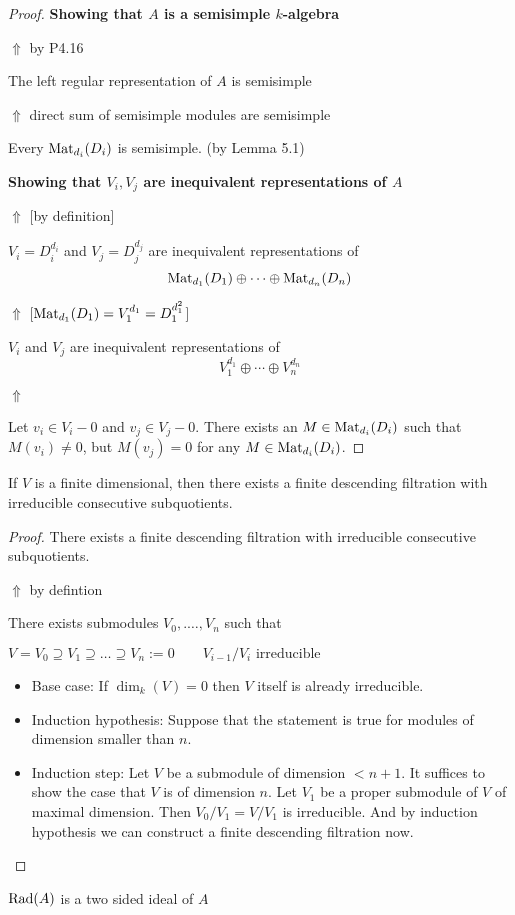 \begin{proof}
\textbf{Showing that \(A\) is a semisimple \(k\)-algebra}

\(\Uparrow \) by P4.16

The left regular representation of \(A\) is semisimple

\(\Uparrow \) direct sum of semisimple modules are semisimple

Every \(\operatorname{Mat}_{d_{i}}(D_{i})\) is semisimple. (by Lemma 5.1)

\textbf{Showing that $V_{i},V_{j}$ are inequivalent representations of \(A\)}

\(\Uparrow \) [by definition]

\(V_{i}=D_{i}^{d_{i}}\) and \(V_{j}=D_{j}^{d_{j}}\) are inequivalent representations of
\[
\operatorname{Mat}_{d_{1}}(D_{1})\oplus \cdots \oplus \operatorname{Mat}_{d_{n}}(D_{n})
\]

\(\Uparrow \) [\(\operatorname{Mat}_{d_{1}}(D_{1})=V_{1}^{d_{1}}=D_{1}^{d_{1}^2}\)]

\(V_{i}\) and \(V_{j}\) are inequivalent representations of
\[
V_{1}^{d_{1}}\oplus \cdots \oplus V_{n}^{d_{n}}
\]

\(\Uparrow \)

Let \(v_{i}\in V_{i}-0\) and \(v_{j}\in V_{j}-0\). There exists an \(M\in \operatorname{Mat}_{d_{i}}(D_{i})\) such that \(M(v_{i})\neq 0\), but \(M(v_{j})=0\) for any \(M\in \operatorname{Mat}_{d_{i}}(D_{i})\).
\end{proof}
\newpage
\begin{prop}
If \(V\) is a finite dimensional, then there exists a finite descending filtration with irreducible consecutive subquotients.
\end{prop}

\begin{proof}
There exists a finite descending filtration with irreducible consecutive subquotients.

\(\Uparrow \) by defintion

There exists submodules \(V_{0},.\ldots ,V_{n}\) such that

\(V=V_{0}\supseteq V_{1}\supseteq \ldots \supseteq V_{n}:=0 \qquad V_{i-1}/V_{i} \text{ irreducible }\)

\begin{itemize}
  \item Base case: If \(\dim_{k}(V)=0\) then \(V\) itself is already irreducible.
  \item Induction hypothesis: Suppose that the statement is true for modules of dimension smaller than $n$.
  \item Induction step: Let $V$ be a submodule of dimension $<n+1$. It suffices to show the case that $V$ is of dimension $n$. Let \(V_{1}\) be a proper submodule of $V$ of maximal dimension. Then \(V_{0}/V_{1}=V/V_{1}\) is irreducible. And by induction hypothesis we can construct a finite descending filtration now.
\end{itemize}
\end{proof}
\newpage
\begin{prop}
\(\operatorname{Rad}(A)\) is a two sided ideal of \(A\)
\end{prop}

